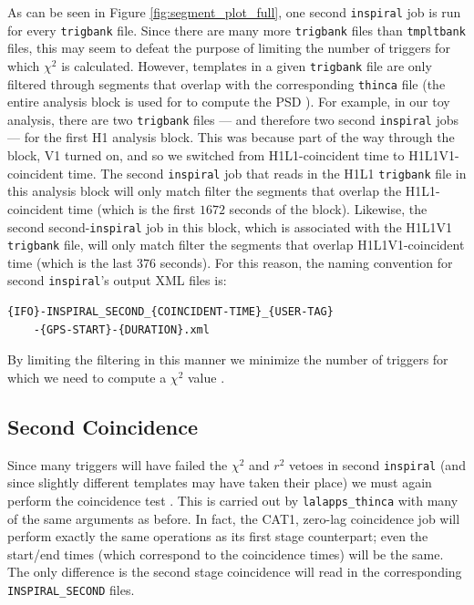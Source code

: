 As can be seen in Figure \ref{fig:segment_plot_full}, one second
\texttt{inspiral} job is run for every \texttt{trigbank} file. Since there are
many more \texttt{trigbank} files than \texttt{tmpltbank} files, this may seem
to defeat the purpose of limiting the number of triggers for which $\chi^2$ is
calculated. However, templates in a given \texttt{trigbank} file are only
filtered through segments that overlap with the corresponding \texttt{thinca}
file  (the entire analysis block is used for to compute the \ac{PSD}
\cite{brown-2005-22}). For example, in our toy analysis, there are two
\texttt{trigbank} files --- and therefore two second \texttt{inspiral} jobs ---
for the first H1 analysis block. This was because part of the way through the
block, V1 turned on, and so we switched from H1L1-coincident time to
H1L1V1-coincident time. The second \texttt{inspiral} job that reads in the H1L1
\texttt{trigbank} file in this analysis block will only match filter the
segments that overlap the H1L1-coincident time (which is the first $1672$
seconds of the block). Likewise, the second second-\texttt{inspiral} job in
this block, which is associated with the H1L1V1 \texttt{trigbank} file, will
only match filter the segments that overlap H1L1V1-coincident time (which is
the last $376$ seconds). For this reason, the naming convention for second
\texttt{inspiral}'s output XML files is:
\begin{verbatim}
{IFO}-INSPIRAL_SECOND_{COINCIDENT-TIME}_{USER-TAG}
    -{GPS-START}-{DURATION}.xml
\end{verbatim}
By limiting the filtering in this manner we minimize the number of triggers for
which we need to compute a $\chi^2$ value \cite{brown-2005-22}.

\subsection{Second Coincidence}
\label{sec:second_thinca}

Since many triggers will have failed the $\chi^2$ and $r^2$ vetoes in second
\texttt{inspiral} (and since slightly different templates may have taken their
place) we must again perform the coincidence test \cite{Keppel:thesis}. This is
carried out by \texttt{lalapps\_thinca} with many of the same arguments as
before. In fact, the CAT1, zero-lag coincidence job will perform exactly the
same operations as its first stage counterpart; even the start/end times (which
correspond to the coincidence times) will be the same. The only difference is
the second stage coincidence will read in the corresponding
\texttt{INSPIRAL\_SECOND} files.

